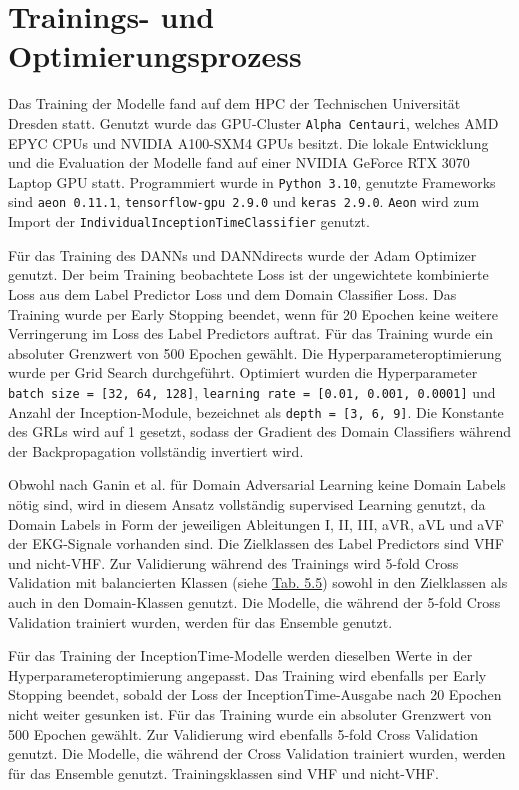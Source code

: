 \section{Trainings- und Optimierungsprozess}\label{sec:trainingsprozess}


Das Training der Modelle fand auf dem \gls{HPC} der Technischen Universität Dresden statt. Genutzt wurde das GPU-Cluster \texttt{Alpha Centauri}, welches AMD EPYC CPUs und NVIDIA A100-SXM4 GPUs besitzt. Die lokale Entwicklung und die Evaluation der Modelle fand auf einer NVIDIA GeForce RTX 3070 Laptop GPU statt. Programmiert wurde in \texttt{Python 3.10}, genutzte Frameworks sind \texttt{aeon 0.11.1}, \texttt{tensorflow-gpu 2.9.0} und \texttt{keras 2.9.0}. \texttt{Aeon} wird zum Import der \texttt{IndividualInceptionTimeClassifier} genutzt.

Für das Training des \gls{DANN}s und DANNdirects wurde der Adam Optimizer genutzt. Der beim Training beobachtete Loss ist der ungewichtete kombinierte Loss aus dem Label Predictor Loss und dem Domain Classifier Loss. Das Training wurde per Early Stopping beendet, wenn für 20 Epochen keine weitere Verringerung im Loss des Label Predictors auftrat. Für das Training wurde ein absoluter Grenzwert von 500 Epochen gewählt.
Die Hyperparameteroptimierung wurde per Grid Search durchgeführt. Optimiert wurden die Hyperparameter \texttt{batch size = [32, 64, 128]}, \texttt{learning rate = [0.01, 0.001, 0.0001]} und Anzahl der Inception-Module, bezeichnet als \texttt{depth = [3, 6, 9]}. Die Konstante des \gls{GRL}s wird auf 1 gesetzt, sodass der Gradient des Domain Classifiers während der Backpropagation vollständig invertiert wird.

Obwohl nach Ganin et al. \cite{ganin_domain-adversarial_2016} für Domain Adversarial Learning keine Domain Labels nötig sind, wird in diesem Ansatz vollständig supervised Learning genutzt, da Domain Labels in Form der jeweiligen Ableitungen I, II, III, aVR, aVL und aVF der \gls{EKG}-Signale vorhanden sind. Die Zielklassen des Label Predictors sind \gls{VHF} und nicht-\gls{VHF}. Zur Validierung während des Trainings wird 5-fold Cross Validation mit balancierten Klassen (siehe \hyperref[tab:folds]{Tab. 5.5}) sowohl in den Zielklassen als auch in den Domain-Klassen genutzt. Die Modelle, die während der 5-fold Cross Validation trainiert wurden, werden für das Ensemble genutzt.

Für das Training der InceptionTime-Modelle werden dieselben Werte in der Hyperparameteroptimierung angepasst. Das Training wird ebenfalls per Early Stopping beendet, sobald der Loss der InceptionTime-Ausgabe nach 20 Epochen nicht weiter gesunken ist. Für das Training wurde ein absoluter Grenzwert von 500 Epochen gewählt. Zur Validierung wird ebenfalls 5-fold Cross Validation genutzt. Die Modelle, die während der Cross Validation trainiert wurden, werden für das Ensemble genutzt. Trainingsklassen sind \gls{VHF} und nicht-\gls{VHF}.


